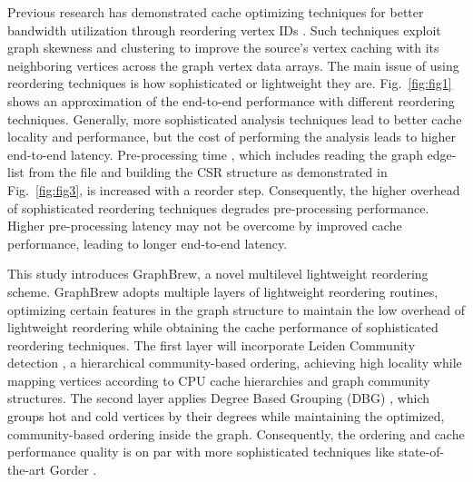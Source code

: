 \documentclass[sigconf, nonacm]{acmart}
\begin{document}
Previous research has demonstrated cache optimizing techniques for better bandwidth utilization through reordering vertex IDs \cite{arai_rabbit_2016,balaji_when_2018,balaji_combining_2019,faldu_closer_2020,wei_speedup_2016}. Such techniques exploit graph skewness and clustering to improve the source's vertex caching with its neighboring vertices across the graph vertex data arrays. The main issue of using reordering techniques is how sophisticated or lightweight they are. Fig.~\ref{fig:fig1} shows an approximation of the end-to-end performance with different reordering techniques. Generally, more sophisticated analysis techniques lead to better cache locality and performance, but the cost of performing the analysis leads to higher end-to-end latency. Pre-processing time \cite{malicevic_everything_2017}, which includes reading the graph edge-list from the file and building the CSR structure as demonstrated in Fig.~\ref{fig:fig3}, is increased with a reorder step. Consequently, the higher overhead of sophisticated reordering techniques degrades pre-processing performance. Higher pre-processing latency may not be overcome by improved cache performance, leading to longer end-to-end latency.

This study introduces GraphBrew, a novel multilevel lightweight reordering scheme. GraphBrew adopts multiple layers of lightweight reordering routines, optimizing certain features in the graph structure to maintain the low overhead of lightweight reordering while obtaining the cache performance of sophisticated reordering techniques.  The first layer will incorporate Leiden Community detection \cite{traag_louvain_2019}, a hierarchical community-based ordering, achieving high locality while mapping vertices according to CPU cache hierarchies and graph community structures. The second layer applies Degree Based Grouping (DBG) \cite{faldu_closer_2020}, which groups hot and cold vertices by their degrees while maintaining the optimized, community-based ordering inside the graph. Consequently, the ordering and cache performance quality is on par with more sophisticated techniques like state-of-the-art Gorder \cite{wei_speedup_2016}.
\end{document}
